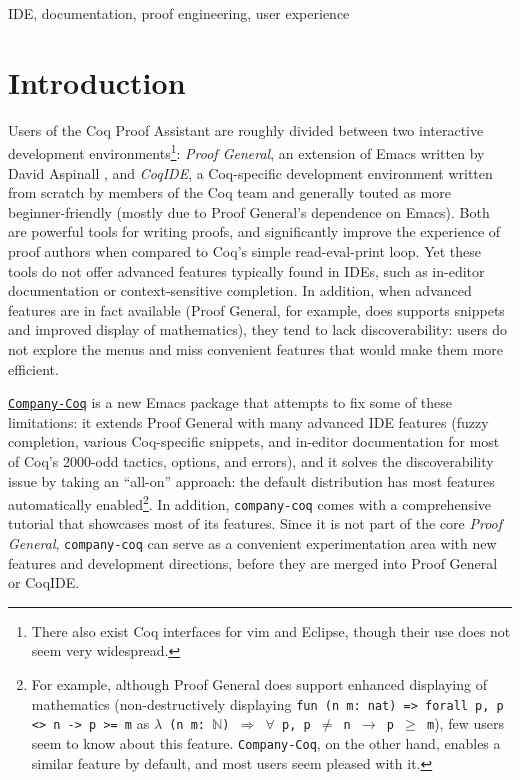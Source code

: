 \documentclass[preprint]{sigplanconf}
\newcommand{\proofg}{Proof General\xspace}
\begin{document}
\keywords IDE, documentation, proof engineering, user experience

\section*{Introduction}

Users of the Coq Proof Assistant \cite{Coq} are roughly divided between two interactive development environments\footnote{There also exist Coq interfaces for vim and Eclipse, though their use does not seem very widespread.}: \emph{\proofg}, an extension of Emacs written by David Aspinall \cite{ProofGeneral}, and \emph{CoqIDE}, a Coq-specific development environment written from scratch by members of the Coq team and generally touted as more beginner-friendly (mostly due to \proofg's dependence on Emacs). Both are powerful tools for writing proofs, and significantly improve the experience of proof authors when compared to Coq's simple read-eval-print loop. Yet these tools do not offer advanced features typically found in IDEs, such as in-editor documentation or context-sensitive completion. In addition, when advanced features are in fact available (\proofg, for example, does supports snippets and improved display of mathematics), they tend to lack discoverability: users do not explore the menus and miss convenient features that would make them more efficient.

\href{https://github.com/cpitclaudel/company-coq/}{\texttt{Company-Coq}} is a new Emacs package that attempts to fix some of these limitations: it extends \proofg with many advanced IDE features (fuzzy completion, various Coq-specific snippets, and in-editor documentation for most of Coq's 2000-odd tactics, options, and errors), and it solves the discoverability issue by taking an ``all-on'' approach: the default distribution has most features automatically enabled\footnote{For example, although \proofg does support enhanced displaying of mathematics (non-destructively displaying \texttt{fun (n m: nat) => forall p, p <> n -> p >= m} as \texttt{$\lambda$ (n m: $\mathbb{N}$) $\Rightarrow$ $\forall$ p, p $\neq$ n $\rightarrow$ p $\geq$ m}), few users seem to know about this feature. \texttt{Company-Coq}, on the other hand, enables a similar feature by default, and most users seem pleased with it.}. In addition, \texttt{company-coq} comes with a comprehensive tutorial that showcases most of its features.
Since it is not part of the core \emph{\proofg}, \texttt{company-coq} can serve as a convenient experimentation area with new features and development directions, before they are merged into \proofg or CoqIDE.
\end{document}
